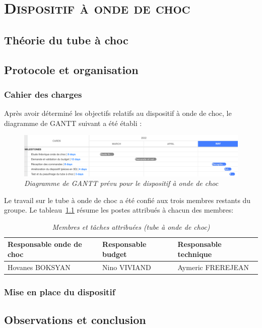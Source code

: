 \renewcommand{\chaptername}{\scshape Partie}
\chapter{\normalfont \scshape Dispositif à onde de choc}
\section{Théorie du tube à choc}
\section{Protocole et organisation}
\subsection{Cahier des charges}
Après avoir déterminé les objectifs relatifs au dispositif à onde de choc, le diagramme de GANTT suivant a été établi :
\begin{figure}[H]
	\includegraphics[scale = 0.4]{figures/gantt_choc.png}
	\caption{\small{\textit{Diagramme de GANTT prévu pour le dispositif à onde de choc}}}
	\label{fig:gantt_choc}
\end{figure}
Le travail sur le tube à onde de choc a été confié aux trois membres restants du groupe. Le tableau~\ref{tab:gestion_choc} résume les postes attribués à chacun des membres:
\begin{table}[H]
	\centering
	\begin{tabular}{|l l l|}
		\hline
		\small\textbf{Responsable onde de choc}&\small\textbf{Responsable budget}&\small\textbf{Responsable technique}\\
		\hline
		\small{Hovanes BOKSYAN}&\small{Nino VIVIAND}&\small{Aymeric FREREJEAN}\\
		\hline
	\end{tabular}
	\caption{\small\textit{Membres et tâches attribuées (tube à onde de choc)}}
	\label{tab:gestion_choc}
\end{table}
\subsection{Mise en place du dispositif}
\section{Observations et conclusion}
